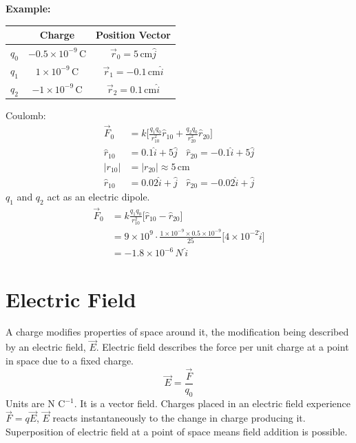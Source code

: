 \documentclass[a4paper, 11pt, normalem]{report}
\begin{document}
\textbf{Example:}
\begin{table}[H]
    \centering
    \begin{tabular}{|c|c|c|}
    \hline
    \rowcolor{lightgray} & Charge & Position Vector \\
    \hline
    $q_{0}$ & $-0.5\times10^{-9}$\,C & $\vec{r}_{0} = 5\,\text{cm}\hat{j}$\\
    \hline
    $q_{1}$ & $1\times10^{-9}$\,C & $\vec{r}_{1} = -0.1\,\text{cm}\hat{i}$\\
    \hline
    $q_{2}$ & $-1\times10^{-9}$\,C & $\vec{r}_{2} = 0.1\,\text{cm}\hat{i}$\\
    \hline
    \end{tabular}
\end{table}
Coulomb:
\begin{align}
    \vec{F}_{0} &= k\Bigg[\frac{q_{1}q_{0}}{r_{10}^{2}}\hat{r}_{10} + \frac{q_{2}q_{0}}{r_{20}^{2}}\hat{r}_{20}\Bigg] \\
    \hat{r}_{10} &= 0.1\hat{i} + 5\hat{j} ~~~~ \hat{r}_{20} = -0.1\hat{i} + 5\hat{j} \\
    |r_{10}| &= |r_{20}| \approx 5\,\text{cm} \\
    \hat{r}_{10} &= 0.02\hat{i} + \hat{j} ~~~~ \hat{r}_{20} = -0.02\hat{i} + \hat{j}
\end{align}
$q_{1}$ and $q_{2}$ act as an electric dipole.
\begin{align}
    \vec{F}_{0} &= k\frac{q_{1}q_{0}}{r_{10}^{2}}\Big[\hat{r}_{10} - \hat{r}_{20}\Big] \\
                &= 9\times10^{9} \cdot \frac{1\times10^{-9}\times0.5\times10^{-9}}{25}\Big[4\times10^{-2}\hat{i}\Big] \\
                &= -1.8\times10^{-6}\,N\,\hat{i}
\end{align}

\section{Electric Field}
A charge modifies properties of space around it, the modification being described by an electric field, $\vec{E}$.
Electric field describes the force per unit charge at a point in space due to a fixed charge.
\begin{equation}
    \vec{E} = \frac{\vec{F}}{q_{0}}
\end{equation}
Units are N C$^{-1}$. It is a vector field.
Charges placed in an electric field experience $\vec{F} = q\vec{E}$, $\vec{E}$ reacts instantaneously to the change in charge producing it.
Superposition of electric field at a point of space means field addition is possible.
\end{document}
